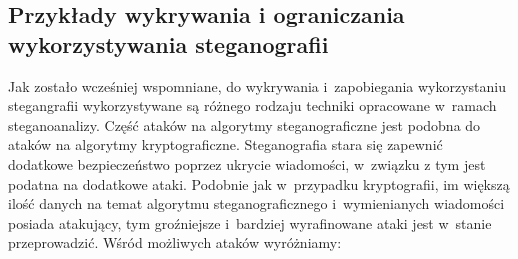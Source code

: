 \documentclass[a4paper, twoside, 12pt]{report}
\begin{document}
        \subsection{Przykłady wykrywania i ograniczania  wykorzystywania steganografii}
        Jak zostało wcześniej wspomniane, do wykrywania i~zapobiegania wykorzystaniu stegangrafii
        wykorzystywane są różnego rodzaju techniki opracowane w~ramach steganoanalizy.
        Część ataków na algorytmy steganograficzne jest podobna do ataków na
        algorytmy kryptograficzne. Steganografia stara się zapewnić dodatkowe bezpieczeństwo
        poprzez ukrycie wiadomości, w~związku z tym jest podatna na dodatkowe ataki.
        Podobnie jak w~przypadku kryptografii, im większą ilość danych na temat
        algorytmu steganograficznego i~wymienianych wiadomości posiada atakujący,
        tym groźniejsze i~bardziej wyrafinowane ataki jest w~stanie przeprowadzić.
        Wśród możliwych ataków wyróżniamy\cite{DISAPPEARINGCRYPTOEMBEDDINGMETDATA}:
\end{document}
